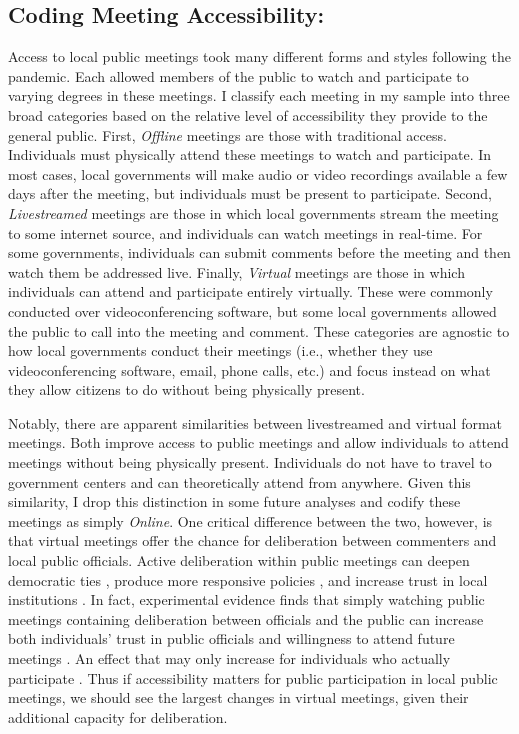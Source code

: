     \subsection{Coding Meeting Accessibility:}
    Access to local public meetings took many different forms and styles following the pandemic. Each allowed members of the public to watch and participate to varying degrees in these meetings. I classify each meeting in my sample into three broad categories based on the relative level of accessibility they provide to the general public. First, \emph{Offline} meetings are those with traditional access. Individuals must physically attend these meetings to watch and participate. In most cases, local governments will make audio or video recordings available a few days after the meeting, but individuals must be present to participate. Second, \emph{Livestreamed} meetings are those in which local governments stream the meeting to some internet source, and individuals can watch meetings in real-time. For some governments, individuals can submit comments before the meeting and then watch them be addressed live. Finally, \emph{Virtual} meetings are those in which individuals can attend and participate entirely virtually. These were commonly conducted over videoconferencing software, but some local governments allowed the public to call into the meeting and comment. These categories are agnostic to how local governments conduct their meetings (i.e., whether they use videoconferencing software, email, phone calls, etc.) and focus instead on what they allow citizens to do without being physically present.

    Notably, there are apparent similarities between livestreamed and virtual format meetings. Both improve access to public meetings and allow individuals to attend meetings without being physically present. Individuals do not have to travel to government centers and can theoretically attend from anywhere. Given this similarity, I drop this distinction in some future analyses and codify these meetings as simply \emph{Online}. One critical difference between the two, however, is that virtual meetings offer the chance for deliberation between commenters and local public officials. Active deliberation within public meetings can deepen democratic ties \citep{bryanRealDemocracyNew2010,gastilCivicAwakeningJury2002,fishkinWhenPeopleSpeak2009}, produce more responsive policies \citep{robertsPublicDeliberationAlternative1997,fungVarietiesParticipationComplex2006}, and increase trust in local institutions \citep{carpiniPUBLICDELIBERATIONDISCURSIVE2004}. In fact, experimental evidence finds that simply watching public meetings containing deliberation between officials and the public can increase both individuals' trust in public officials and willingness to attend future meetings \citep{collinsDoesMeetingStyle2021}. An effect that may only increase for individuals who actually participate \citep{gastilCivicAwakeningJury2002,minozziTestingBenefitsPublic2023}. Thus if accessibility matters for public participation in local public meetings, we should see the largest changes in virtual meetings, given their additional capacity for deliberation.

